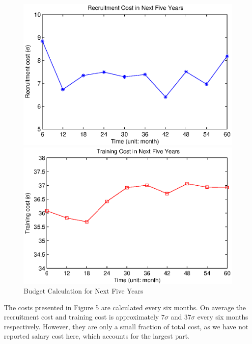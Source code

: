\documentclass[tcn = 37075, sheet = false, abstract = false]{mcmthesis}
\begin{document}
\begin{figure}[htbp]
\begin{minipage}[t]{0.5\linewidth}
\centering
\includegraphics[width=1.0\textwidth]{figures/Recruitment_Cost.eps}
\end{minipage}%
\begin{minipage}[t]{0.5\linewidth}
\centering
\includegraphics[width=1.0\textwidth]{figures/Training_Cost.eps}
\end{minipage}%
\label{fig:bb5}
\caption{Budget Calculation for Next Five Years}
\end{figure}

The costs presented in Figure 5 are calculated every six months. On average the recruitment cost and training cost is approximately $7\sigma$ and $37\sigma$ every six months respectively. However, they are only a small fraction of total cost, as we have not reported salary cost here, which accounts for the largest part.
\end{document}
